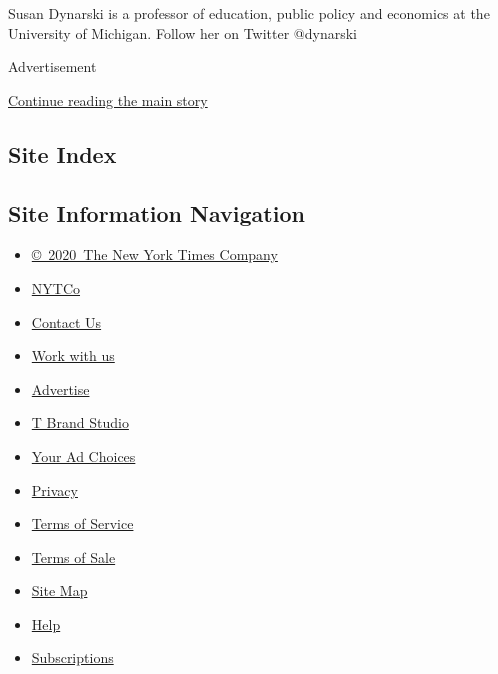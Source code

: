 Susan Dynarski is a professor of education, public policy and economics
at the University of Michigan. Follow her on Twitter @dynarski

Advertisement

\protect\hyperlink{after-bottom}{Continue reading the main story}

\hypertarget{site-index}{%
\subsection{Site Index}\label{site-index}}

\hypertarget{site-information-navigation}{%
\subsection{Site Information
Navigation}\label{site-information-navigation}}

\begin{itemize}
\tightlist
\item
  \href{https://help.nytimes.com/hc/en-us/articles/115014792127-Copyright-notice}{©~2020~The
  New York Times Company}
\end{itemize}

\begin{itemize}
\tightlist
\item
  \href{https://www.nytco.com/}{NYTCo}
\item
  \href{https://help.nytimes.com/hc/en-us/articles/115015385887-Contact-Us}{Contact
  Us}
\item
  \href{https://www.nytco.com/careers/}{Work with us}
\item
  \href{https://nytmediakit.com/}{Advertise}
\item
  \href{http://www.tbrandstudio.com/}{T Brand Studio}
\item
  \href{https://www.nytimes.com/privacy/cookie-policy\#how-do-i-manage-trackers}{Your
  Ad Choices}
\item
  \href{https://www.nytimes.com/privacy}{Privacy}
\item
  \href{https://help.nytimes.com/hc/en-us/articles/115014893428-Terms-of-service}{Terms
  of Service}
\item
  \href{https://help.nytimes.com/hc/en-us/articles/115014893968-Terms-of-sale}{Terms
  of Sale}
\item
  \href{https://spiderbites.nytimes.com}{Site Map}
\item
  \href{https://help.nytimes.com/hc/en-us}{Help}
\item
  \href{https://www.nytimes.com/subscription?campaignId=37WXW}{Subscriptions}
\end{itemize}
